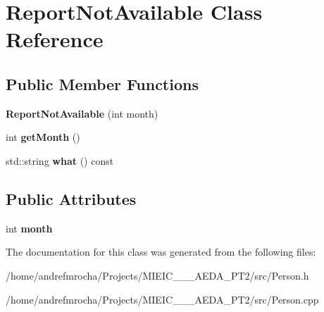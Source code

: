 \hypertarget{class_report_not_available}{}\section{Report\+Not\+Available Class Reference}
\label{class_report_not_available}
\subsection*{Public Member Functions}
\begin{DoxyCompactItemize}
\item 
\mbox{\label{class_report_not_available_af8c20e04e062f7922f5507ca31d37854}} 
{\bfseries Report\+Not\+Available} (int month)
\item 
\mbox{\label{class_report_not_available_a64bf230892d4e34fecb8143d04b95d02}} 
int {\bfseries get\+Month} ()
\item 
\mbox{\label{class_report_not_available_a2139ebc44990ab772c6e56d0a0d71e7d}} 
std\+::string {\bfseries what} () const
\end{DoxyCompactItemize}
\subsection*{Public Attributes}
\begin{DoxyCompactItemize}
\item 
\mbox{\label{class_report_not_available_a11686bc53e58de31838b14e6a23ec0c6}} 
int {\bfseries month}
\end{DoxyCompactItemize}


The documentation for this class was generated from the following files\+:\begin{DoxyCompactItemize}
\item 
/home/andrefmrocha/\+Projects/\+M\+I\+E\+I\+C\+\_\+\_\+\_\+\+A\+E\+D\+A\+\_\+\+P\+T2/src/Person.\+h\item 
/home/andrefmrocha/\+Projects/\+M\+I\+E\+I\+C\+\_\+\_\+\_\+\+A\+E\+D\+A\+\_\+\+P\+T2/src/Person.\+cpp\end{DoxyCompactItemize}
